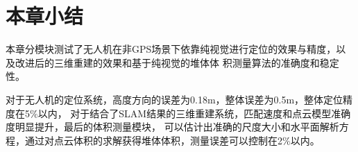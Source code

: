 


\section{本章小结}
本章分模块测试了无人机在非GPS场景下依靠纯视觉进行定位的效果与精度，以及改进后的三维重建的效果和基于纯视觉的堆体体
积测量算法的准确度和稳定性。

对于无人机的定位系统，高度方向的误差为0.18m，整体误差为0.5m，整体定位精度在5$\%$以内，
对于结合了SLAM结果的三维重建系统，匹配速度和点云模型准确度明显提升，最后的体积测量模块，
可以估计出准确的尺度大小和水平面解析方程，通过对点云体积的求解获得堆体体积，测量误差可以控制在2$\%$以内。
